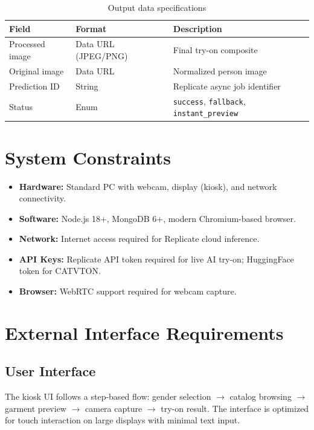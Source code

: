 \begin{table}[H]
  \centering
  \caption{Output data specifications}
  \label{tab:output-data}
  \begin{tabular}{@{}llp{7cm}@{}}
    \toprule
    \textbf{Field} & \textbf{Format} & \textbf{Description} \\
    \midrule
    Processed image & Data URL (JPEG/PNG) & Final try-on composite \\
    Original image & Data URL & Normalized person image \\
    Prediction ID & String & Replicate async job identifier \\
    Status & Enum & \texttt{success}, \texttt{fallback}, \texttt{instant\_preview} \\
    \bottomrule
  \end{tabular}
\end{table}

\section{System Constraints}
\label{sec:constraints}

\begin{itemize}[leftmargin=*]
  \item \textbf{Hardware:} Standard PC with webcam, display (kiosk), and network connectivity.
  \item \textbf{Software:} Node.js 18+, MongoDB 6+, modern Chromium-based browser.
  \item \textbf{Network:} Internet access required for Replicate cloud inference.
  \item \textbf{API Keys:} Replicate API token required for live AI try-on; HuggingFace token for CATVTON.
  \item \textbf{Browser:} WebRTC support required for webcam capture.
\end{itemize}

\section{External Interface Requirements}
\label{sec:interfaces}

\subsection{User Interface}

The kiosk UI follows a step-based flow: gender selection $\rightarrow$ catalog browsing $\rightarrow$ garment preview $\rightarrow$ camera capture $\rightarrow$ try-on result. The interface is optimized for touch interaction on large displays with minimal text input.

